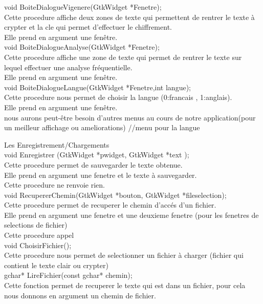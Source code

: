 \documentclass[a4]{article}
\begin{document}
	void BoiteDialogueVigenere(GtkWidget *Fenetre);\\
		Cette procedure affiche deux zones de texte qui permettent de rentrer le texte à crypter et la cle qui permet d'effectuer le chiffrement.\\
		Elle prend en argument une fenêtre.\\
		
	void BoiteDialogueAnalyse(GtkWidget *Fenetre);\\
		Cette procedure affiche une zone de texte qui permet de rentrer le texte sur lequel effectuer une analyse fréquentielle.\\
		Elle prend en argument une fenêtre.\\
		
	void BoiteDialogueLangue(GtkWidget *Fenetre,int langue);\\
		Cette procedure nous permet de choisir la langue (0:francais , 1:anglais).\\
		Elle prend en argument une fenêtre.\\
		
	nous aurons peut-être besoin d'autres menus au cours de notre application(pour un meilleur affichage ou ameliorations) 
	//menu pour la langue
	
	Les Enregistrement/Chargements\\
	
	void Enregistrer (GtkWidget *pwidget, GtkWidget *text );\\
		Cette procedure permet de sauvegarder le texte obtenue.\\
		Elle prend en argument une fenetre et le texte à sauvegarder.\\
		Cette procedure ne renvoie rien.\\
	
	void RecupererChemin(GtkWidget *bouton, GtkWidget *fileselection);\\
		Cette procedure permet de recuperer le chemin d'accés d'un fichier.\\
		Elle prend en argument une fenetre et une deuxieme fenetre (pour les fenetres de selections de fichier)\\
		Cette procedure appel\\

	void ChoisirFichier();\\
		Cette procedure nous permet de selectionner un fichier à charger (fichier qui contient le texte clair ou 		crypter)\\

		
	gchar* LireFichier(const gchar* chemin);\\
		Cette fonction permet de recuperer le texte qui est dans un fichier, pour cela nous donnons en argument un chemin de fichier.\\
	
\end{document}
